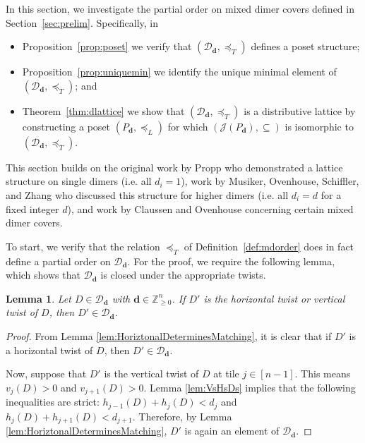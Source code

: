 \documentclass{amsart}
\newtheorem{lemma}[theorem]{Lemma}
\theoremstyle{definition}
\begin{document}
In this section, we investigate the partial order on mixed dimer covers defined in Section~\ref{sec:prelim}. Specifically, in
\begin{itemize}
    \item[$(1)$] Proposition~\ref{prop:poset} we verify that $(\mathcal{D}_\mathbf{d},\preceq_T)$ defines a poset structure;
    \item[$(2)$] Proposition~\ref{prop:uniquemin} we identify the unique minimal element of $(\mathcal{D}_\mathbf{d},\preceq_T)$; and
    \item[$(3)$] Theorem~\ref{thm:dlattice} we show that $(\mathcal{D}_\mathbf{d},\preceq_T)$ is a distributive lattice by constructing a poset $(P_\mathbf{d},\preceq_L)$ for which $(\mathcal{J}(P_\mathbf{d}),\subseteq)$ is isomorphic to $(\mathcal{D}_\mathbf{d},\preceq_T)$.
\end{itemize}
This section builds on the original work by Propp \cite{propp2002lattice} who demonstrated a lattice structure on single dimers (i.e. all $d_i = 1$),
work by Musiker, Ovenhouse, Schiffler, and Zhang \cite{zbMATH08171225} who discussed this structure for higher dimers (i.e. all $d_i = d$ for a fixed integer $d$), and work by Claussen and Ovenhouse \cite{ClaussenOvenhouse} concerning certain mixed dimer covers.

To start, we verify that the relation $\preceq_T$ of Definition~\ref{def:mdorder} does in fact define a partial order on $\mathcal{D}_{\mathbf{d}}$. For the proof, we require the following lemma, which shows that $\mathcal{D}_\mathbf{d}$ is closed under the appropriate twists.

\begin{lemma}
Let $D \in \mathcal{D}_{\mathbf{d}}$ with $\mathbf{d}\in\mathbb{Z}^n_{\ge 0}$. If $D'$ is the horizontal twist or vertical twist of $D$, then $D' \in \mathcal{D}_{\mathbf{d}}$.
\end{lemma}
\begin{proof}
 From Lemma \ref{lem:HoriztonalDeterminesMatching}, it is clear that if $D'$ is a horizontal twist of $D$, then $D' \in \mathcal{D}_{\mathbf{d}}$.

Now, suppose that $D'$ is the vertical twist of $D$ at tile $j\in [n-1]$. This means $v_j(D) > 0$ and $v_{j+1}(D) > 0$. Lemma \ref{lem:VsHsDs} implies that the following inequalities are strict: $h_{j-1}(D) + h_j(D) < d_j$ and $h_j(D) + h_{j+1}(D) < d_{j+1}$. Therefore, by Lemma \ref{lem:HoriztonalDeterminesMatching}, $D'$ is again an element of $\mathcal{D}_{\mathbf{d}}$.
 \end{proof}
\end{document}
